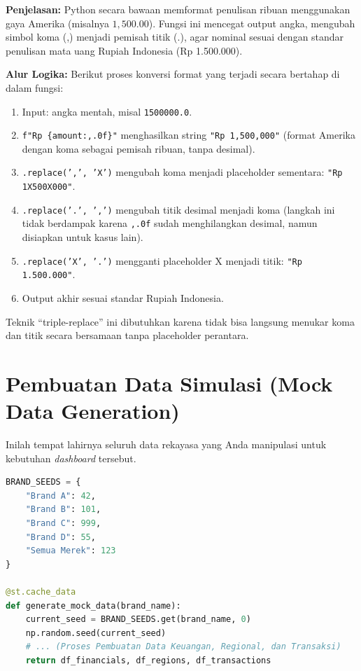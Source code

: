 \documentclass{article}
\begin{document}
\textbf{Penjelasan:}
Python secara bawaan memformat penulisan ribuan menggunakan gaya Amerika (misalnya $1,500.00$). Fungsi ini mencegat output angka, mengubah simbol koma (,) menjadi pemisah titik (.), agar nominal sesuai dengan standar penulisan mata uang Rupiah Indonesia (Rp 1.500.000).

\textbf{Alur Logika:}
Berikut proses konversi format yang terjadi secara bertahap di dalam fungsi:
\begin{enumerate}
	\item Input: angka mentah, misal \texttt{1500000.0}.
	\item \texttt{f"Rp \{amount:,.0f\}"} menghasilkan string \texttt{"Rp 1,500,000"} (format Amerika dengan koma sebagai pemisah ribuan, tanpa desimal).
	\item \texttt{.replace(',', 'X')} mengubah koma menjadi placeholder sementara: \texttt{"Rp 1X500X000"}.
	\item \texttt{.replace('.', ',')} mengubah titik desimal menjadi koma (langkah ini tidak berdampak karena \texttt{,.0f} sudah menghilangkan desimal, namun disiapkan untuk kasus lain).
	\item \texttt{.replace('X', '.')} mengganti placeholder X menjadi titik: \texttt{"Rp 1.500.000"}.
	\item Output akhir sesuai standar Rupiah Indonesia.
\end{enumerate}
Teknik ``triple-replace'' ini dibutuhkan karena tidak bisa langsung menukar koma dan titik secara bersamaan tanpa placeholder perantara.

\section{Pembuatan Data Simulasi (Mock Data Generation)}
Inilah tempat lahirnya seluruh data rekayasa yang Anda manipulasi untuk kebutuhan \textit{dashboard} tersebut.

\begin{lstlisting}[language=Python]
BRAND_SEEDS = {
    "Brand A": 42,
    "Brand B": 101,
    "Brand C": 999,
    "Brand D": 55,
    "Semua Merek": 123
}

@st.cache_data
def generate_mock_data(brand_name):
    current_seed = BRAND_SEEDS.get(brand_name, 0)
    np.random.seed(current_seed)
    # ... (Proses Pembuatan Data Keuangan, Regional, dan Transaksi)
    return df_financials, df_regions, df_transactions
\end{lstlisting}
\end{document}

